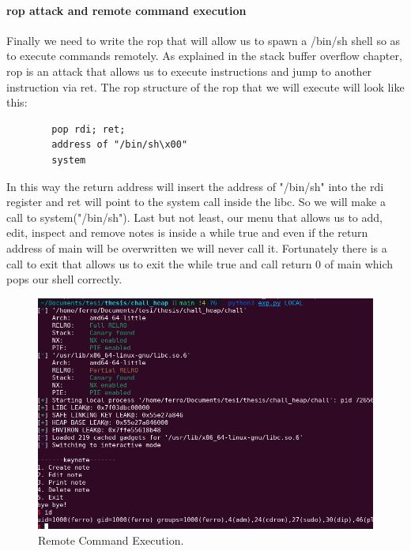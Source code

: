     \paragraph{rop attack and remote command execution}
    Finally we need to write the rop that will allow us to spawn a /bin/sh shell so as to execute commands remotely.\newline
    As explained in the stack buffer overflow chapter, rop is an attack that allows us to execute instructions and jump to another instruction via ret.\newline
    The rop structure of the rop that we will execute will look like this:
    \begin{verbatim}
        pop rdi; ret;
        address of "/bin/sh\x00"
        system 
    \end{verbatim}
    In this way the return address will insert the address of "/bin/sh" into the rdi register and ret will point to the system call inside the libc.\newline
    So we will make a call to system("/bin/sh").\newline
    Last but not least, our menu that allows us to add, edit, inspect and remove notes is inside a while true and even if the return address of main will be overwritten we will never call it.\newline
    Fortunately there is a call to exit that allows us to exit the while true and call return 0 of main which pops our shell correctly.\newline
    \begin{figure}[htbp]
        \centering
        \includegraphics[width=0.9\linewidth]{Images/RCE_chall_heap.png}
        \caption{Remote Command Execution.}
        \label{fig:enter-label}
    \end{figure}